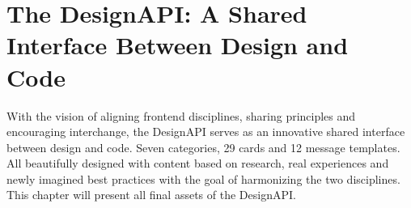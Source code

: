 \newpage
\section{The DesignAPI: A Shared Interface Between Design and Code}
With the vision of aligning frontend disciplines, sharing principles and encouraging interchange,
the DesignAPI serves as an innovative shared interface between design and code. Seven categories, 29
cards and 12 message templates. All beautifully designed with content based on research, real
experiences and newly imagined best practices with the goal of harmonizing the two disciplines. This
chapter will present all final assets of the DesignAPI.






